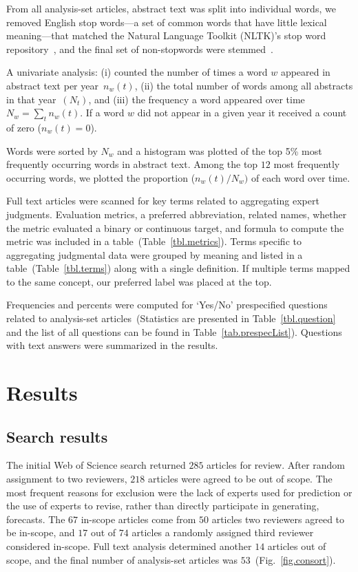 \documentclass[preprint,authoryear]{elsarticle}
\begin{document}
From all analysis-set articles, abstract text was split into individual words, we removed English stop words---a set of common words that have little lexical meaning---that matched the Natural Language Toolkit (NLTK)'s stop word repository~\citep{loper2002nltk}, and the final set of non-stopwords were stemmed~\cite{willett2006porter}.

A univariate analysis: (i) counted the number of times a word $w$ appeared in abstract text per year~$n_{w}(t)$, (ii) the total number of words among all abstracts in that year~$(N_{t})$, and (iii) the frequency a word appeared over time $N_{w} = \sum_{t} n_{w}(t)$.
If a word $w$ did not appear in a given year it received a count of zero ($n_{w}(t)=0$).

Words were sorted by $N_{w}$ and a histogram was plotted of the top 5\% most frequently occurring words in abstract text.
Among the top $12$ most frequently occurring words, we plotted the proportion ($n_{w}(t)/N_{w})$ of each word over time.

Full text articles were scanned for key terms related to aggregating expert judgments.
Evaluation metrics, a preferred abbreviation, related names, whether the metric evaluated a binary or continuous target, and formula to compute the metric was included in a table~(Table~\ref{tbl.metrics}).  
Terms specific to aggregating judgmental data were grouped by meaning and listed in a table~(Table~\ref{tbl.terms}) along with a single definition.
If multiple terms mapped to the same concept, our preferred label was placed at the top. 

Frequencies and percents were computed for `Yes/No' prespecified questions related to analysis-set articles~(Statistics are presented in Table~\ref{tbl.question} and the list of all questions can be found in Table~\ref{tab.prespecList}).
Questions with text answers were summarized in the results. 

\section{Results}
\label{sec.results}

\subsection{Search results}

The initial Web of Science search returned $285$ articles for review.
After random assignment to two reviewers, $218$ articles were agreed  to be out of scope. 
The most frequent reasons for exclusion were the lack of experts used for prediction or the use of experts to revise, rather than directly participate in generating, forecasts.
The $67$ in-scope articles come from $50$ articles two reviewers agreed to be in-scope, and $17$ out of $74$ articles a randomly assigned third reviewer considered in-scope.
Full text analysis determined another $14$ articles out of scope, and the final number of analysis-set articles was $53$~(Fig.~\ref{fig.consort}).
\end{document}
